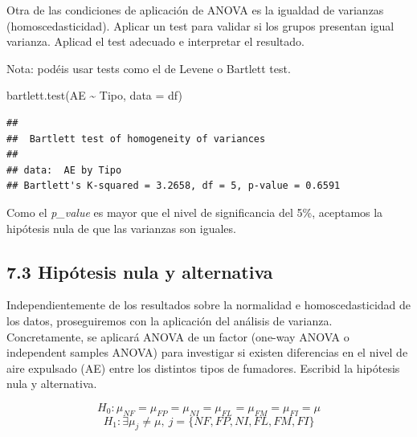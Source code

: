 \documentclass[
]{article}
\newenvironment{Shaded}{\begin{snugshade}}{\end{snugshade}}
\newcommand{\AttributeTok}[1]{\textcolor[rgb]{0.77,0.63,0.00}{#1}}
\newcommand{\FunctionTok}[1]{\textcolor[rgb]{0.00,0.00,0.00}{#1}}
\newcommand{\NormalTok}[1]{#1}
\newcommand{\SpecialCharTok}[1]{\textcolor[rgb]{0.00,0.00,0.00}{#1}}
\begin{document}
Otra de las condiciones de aplicación de ANOVA es la igualdad de
varianzas (homoscedasticidad). Aplicar un test para validar si los
grupos presentan igual varianza. Aplicad el test adecuado e interpretar
el resultado.

Nota: podéis usar tests como el de Levene o Bartlett test.

\vspace{0.3cm}

\begin{Shaded}
\begin{Highlighting}[]
\FunctionTok{bartlett.test}\NormalTok{(AE }\SpecialCharTok{\textasciitilde{}}\NormalTok{ Tipo, }\AttributeTok{data =}\NormalTok{ df)}
\end{Highlighting}
\end{Shaded}

\begin{verbatim}
## 
##  Bartlett test of homogeneity of variances
## 
## data:  AE by Tipo
## Bartlett's K-squared = 3.2658, df = 5, p-value = 0.6591
\end{verbatim}

\vspace{0.3cm}

Como el \emph{p\_value} es mayor que el nivel de significancia del 5\%,
aceptamos la hipótesis nula de que las varianzas son iguales.

\vspace{0.3cm}

\hypertarget{hipuxf3tesis-nula-y-alternativa}{%
\subsection{7.3 Hipótesis nula y
alternativa}\label{hipuxf3tesis-nula-y-alternativa}}

Independientemente de los resultados sobre la normalidad e
homoscedasticidad de los datos, proseguiremos con la aplicación del
análisis de varianza. Concretamente, se aplicará ANOVA de un factor
(one-way ANOVA o independent samples ANOVA) para investigar si existen
diferencias en el nivel de aire expulsado (AE) entre los distintos tipos
de fumadores. Escribid la hipótesis nula y alternativa.

\vspace{0.3cm}

\[ H_0: \mu_{NF} = \mu_{FP} = \mu_{NI} = \mu_{FL} = \mu_{FM} = \mu_{FI} = \mu \]
\[ H_1: \exists\mu_j \neq \mu, \ j=\{NF, FP, NI, FL, FM, FI\}\]

\vspace{0.3cm}
\end{document}
